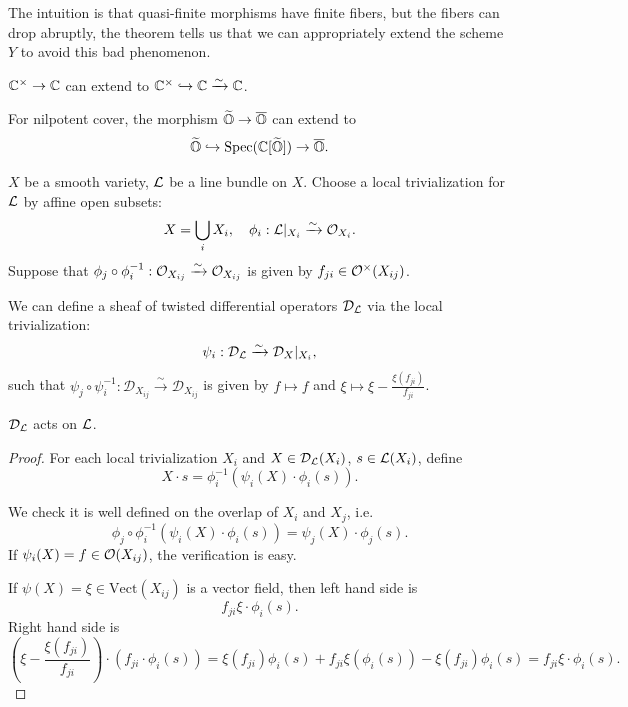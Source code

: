 The intuition is that quasi-finite morphisms have finite fibers, but the fibers can drop abruptly, the theorem tells us that we can appropriately extend the scheme $Y$ to avoid this bad phenomenon.

\begin{examp}
  $\mathbb{C}^{\times} \to \mathbb{C}$ can extend to $\mathbb{C}^{\times} \hookrightarrow \mathbb{C} \xrightarrow{\sim} \mathbb{C}$.
\end{examp}

\begin{examp}
  For nilpotent cover, the morphism $\widetilde{\mathbb{O}} \to \overline{\mathbb{O}}$ can extend to
  \[\widetilde{\mathbb{O}} \hookrightarrow \operatorname{Spec}(\mathbb{C}[\widetilde{\mathbb{O}}]) \to \overline{\mathbb{O}}.\]
\end{examp}



$X$ be a smooth variety, $\mathcal{L}$ be a line bundle on $X$. Choose a local trivialization for $\mathcal{L}$ by affine open subsets:
\[
  X = \bigcup_{i} X_i, \quad \phi_i: \mathcal{L}|_{X_i} \xrightarrow{\sim} \mathcal{O}_{X_i}.
\]
Suppose that $\phi_j \circ \phi_i^{-1} : \mathcal{O}_{X_{ij}} \xrightarrow{\sim} \mathcal{O}_{X_{ij}}$ is given by $f_{ji} \in \mathcal{O}^{\times}(X_{ij})$.

We can define a sheaf of twisted differential operators $\mathcal{D}_{\mathcal{L}}$ via the local trivialization:
\[
  \psi_i: \mathcal{D}_{\mathcal{L}} \xrightarrow{\sim} \mathcal{D}_X|_{X_i},
\]
such that $\psi_j \circ \psi_i^{-1}: \mathcal{D}_{X_{ij}} \xrightarrow{\sim} \mathcal{D}_{X_{ij}}$ is given by $f \mapsto f$ and $\xi \mapsto \xi - \frac{\xi(f_{ji})}{f_{ji}}$.

\begin{thm}
  $\mathcal{D}_{\mathcal{L}}$ acts on $\mathcal{L}$.
\end{thm}

\begin{proof}
  For each local trivialization $X_i$ and $X \in \mathcal{D}_{\mathcal{L}}(X_i)$, $s \in \mathcal{L}(X_i)$,  define
  \[X \cdot s = \phi_i^{-1}(\psi_i(X) \cdot \phi_i(s)).\]

  We check it is well defined on the overlap of $X_i$ and $X_j$, i.e.
  \[
    \phi_j \circ \phi_i^{-1} (\psi_i(X) \cdot \phi_i(s))  = \psi_j(X) \cdot \phi_j(s).
  \]
  If $\psi_i(X) = f \in \mathcal{O}(X_{ij})$, the verification is easy.

  If $\psi(X) = \xi \in \mathrm{Vect}(X_{ij})$ is a vector field, then left hand side is
  \[
    f_{ji} \xi \cdot \phi_i(s).
  \]
  Right hand side is
  \[
    (\xi - \frac{\xi(f_{ji})}{f_{ji}}) \cdot (f_{ji} \cdot \phi_i(s)) = \xi(f_{ji})\phi_i(s) + f_{ji} \xi(\phi_i(s)) - \xi(f_{ji})\phi_i(s) = f_{ji}\xi \cdot \phi_i(s).
  \]

\end{proof}




